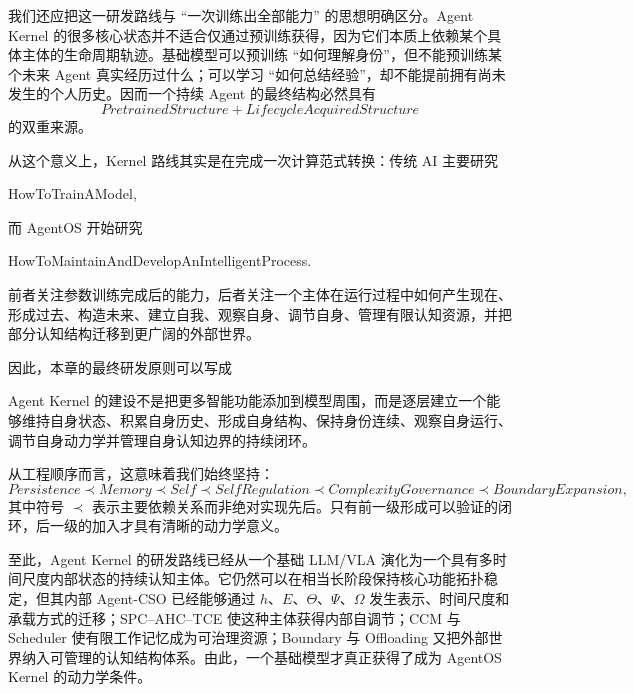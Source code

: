 我们还应把这一研发路线与 ``一次训练出全部能力'' 的思想明确区分。Agent Kernel 的很多核心状态并不适合仅通过预训练获得，因为它们本质上依赖某个具体主体的生命周期轨迹。基础模型可以预训练 ``如何理解身份''，但不能预训练某个未来 Agent 真实经历过什么；可以学习 ``如何总结经验''，却不能提前拥有尚未发生的个人历史。因而一个持续 Agent 的最终结构必然具有
\[
PretrainedStructure
+
LifecycleAcquiredStructure
\]
的双重来源。

从这个意义上，Kernel 路线其实是在完成一次计算范式转换：传统 AI 主要研究
\begin{statementbox}
HowToTrainAModel,
\end{statementbox}
而 AgentOS 开始研究
\begin{statementbox}
HowToMaintainAndDevelopAnIntelligentProcess.
\end{statementbox}
前者关注参数训练完成后的能力，后者关注一个主体在运行过程中如何产生现在、形成过去、构造未来、建立自我、观察自身、调节自身、管理有限认知资源，并把部分认知结构迁移到更广阔的外部世界。

因此，本章的最终研发原则可以写成
\begin{proposition*}
Agent Kernel 的建设不是把更多智能功能添加到模型周围，而是逐层建立一个能够维持自身状态、积累自身历史、形成自身结构、保持身份连续、观察自身运行、调节自身动力学并管理自身认知边界的持续闭环。
\end{proposition*}

从工程顺序而言，这意味着我们始终坚持：
\[
\boxed{
Persistence
\prec
Memory
\prec
Self
\prec
SelfRegulation
\prec
ComplexityGovernance
\prec
BoundaryExpansion,
}
\]
其中符号 $\prec$ 表示主要依赖关系而非绝对实现先后。只有前一级形成可以验证的闭环，后一级的加入才具有清晰的动力学意义。

至此，Agent Kernel 的研发路线已经从一个基础 LLM/VLA 演化为一个具有多时间尺度内部状态的持续认知主体。它仍然可以在相当长阶段保持核心功能拓扑稳定，但其内部 Agent-CSO 已经能够通过 $h$、$E$、$\Theta$、$\Psi$、$\Omega$ 发生表示、时间尺度和承载方式的迁移；SPC--AHC--TCE 使这种主体获得内部自调节；CCM 与 Scheduler 使有限工作记忆成为可治理资源；Boundary 与 Offloading 又把外部世界纳入可管理的认知结构体系。由此，一个基础模型才真正获得了成为 AgentOS Kernel 的动力学条件。
